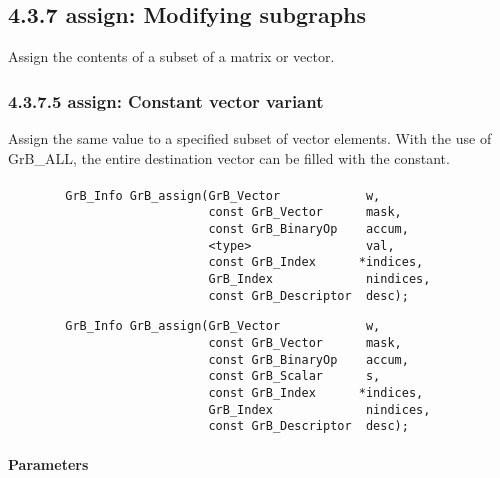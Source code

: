 
\subsection*{4.3.7 {\sf assign}: Modifying subgraphs}

Assign the contents of a subset of a matrix or vector.


\subsubsection*{4.3.7.5 {\sf assign}: Constant vector variant}

Assign the same value to a specified subset of vector elements.  With the use of
{\sf GrB\_ALL}, the entire destination vector can be filled with the constant.

\paragraph{\syntax}

\begin{verbatim}
        GrB_Info GrB_assign(GrB_Vector            w,
                            const GrB_Vector      mask,
                            const GrB_BinaryOp    accum,
                            <type>                val,
                            const GrB_Index      *indices,
                            GrB_Index             nindices,
                            const GrB_Descriptor  desc);
\end{verbatim}

{\color{red}
\begin{verbatim}
        GrB_Info GrB_assign(GrB_Vector            w,
                            const GrB_Vector      mask,
                            const GrB_BinaryOp    accum,
                            const GrB_Scalar      s,
                            const GrB_Index      *indices,
                            GrB_Index             nindices,
                            const GrB_Descriptor  desc);
\end{verbatim}
}

\paragraph{Parameters}

